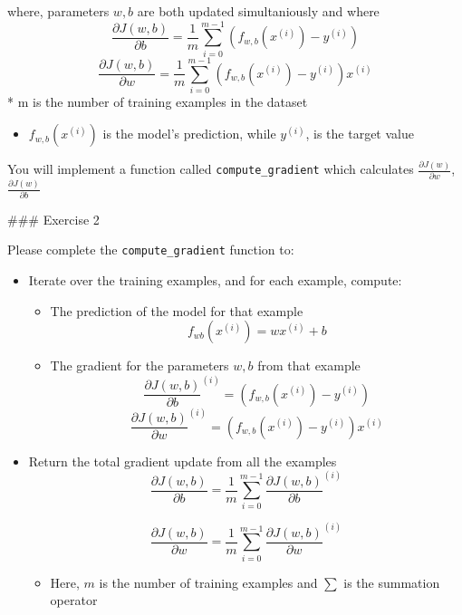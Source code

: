 \documentclass[11pt]{article}
\providecommand{\tightlist}{%
      \setlength{\itemsep}{0pt}\setlength{\parskip}{0pt}}
\begin{document}
where, parameters \(w, b\) are both updated simultaniously and where\\
\[
\frac{\partial J(w,b)}{\partial b}  = \frac{1}{m} \sum\limits_{i = 0}^{m-1} (f_{w,b}(x^{(i)}) - y^{(i)}) \tag{2}
\] \[
\frac{\partial J(w,b)}{\partial w}  = \frac{1}{m} \sum\limits_{i = 0}^{m-1} (f_{w,b}(x^{(i)}) -y^{(i)})x^{(i)} \tag{3}
\] * m is the number of training examples in the dataset

\begin{itemize}
\tightlist
\item
  \(f_{w,b}(x^{(i)})\) is the model's prediction, while \(y^{(i)}\), is
  the target value
\end{itemize}

You will implement a function called \texttt{compute\_gradient} which
calculates \(\frac{\partial J(w)}{\partial w}\),
\(\frac{\partial J(w)}{\partial b}\)

    \#\#\# Exercise 2

Please complete the \texttt{compute\_gradient} function to:

\begin{itemize}
\item
  Iterate over the training examples, and for each example, compute:

  \begin{itemize}
  \item
    The prediction of the model for that example \[
      f_{wb}(x^{(i)}) =  wx^{(i)} + b 
      \]
  \item
    The gradient for the parameters \(w, b\) from that example \[
      \frac{\partial J(w,b)}{\partial b}^{(i)}  =  (f_{w,b}(x^{(i)}) - y^{(i)}) 
      \] \[
      \frac{\partial J(w,b)}{\partial w}^{(i)}  =  (f_{w,b}(x^{(i)}) -y^{(i)})x^{(i)} 
      \]
  \end{itemize}
\item
  Return the total gradient update from all the examples \[
    \frac{\partial J(w,b)}{\partial b}  = \frac{1}{m} \sum\limits_{i = 0}^{m-1} \frac{\partial J(w,b)}{\partial b}^{(i)}
    \]

  \[
    \frac{\partial J(w,b)}{\partial w}  = \frac{1}{m} \sum\limits_{i = 0}^{m-1} \frac{\partial J(w,b)}{\partial w}^{(i)} 
    \]

  \begin{itemize}
  \tightlist
  \item
    Here, \(m\) is the number of training examples and \(\sum\) is the
    summation operator
  \end{itemize}
\end{itemize}
\end{document}
